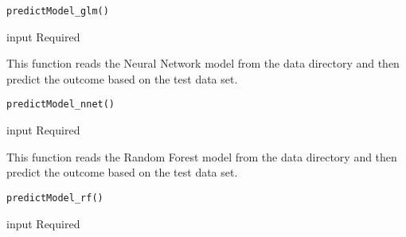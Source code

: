 \documentclass[a4paper]{book}
\begin{document}
%
\begin{Usage}
\begin{verbatim}
predictModel_glm()
\end{verbatim}
\end{Usage}
%
\begin{Arguments}
\begin{ldescription}
\item[\code{No}] input Required
\end{ldescription}
\end{Arguments}
%
\begin{Description}\relax
This function reads the Neural Network model from the data directory and then predict the outcome based on the test data set.
\end{Description}
%
\begin{Usage}
\begin{verbatim}
predictModel_nnet()
\end{verbatim}
\end{Usage}
%
\begin{Arguments}
\begin{ldescription}
\item[\code{No}] input Required
\end{ldescription}
\end{Arguments}
%
\begin{Description}\relax
This function reads the Random Forest model from the data directory and then predict the outcome based on the test data set.
\end{Description}
%
\begin{Usage}
\begin{verbatim}
predictModel_rf()
\end{verbatim}
\end{Usage}
%
\begin{Arguments}
\begin{ldescription}
\item[\code{No}] input Required
\end{ldescription}
\end{Arguments}
\end{document}
